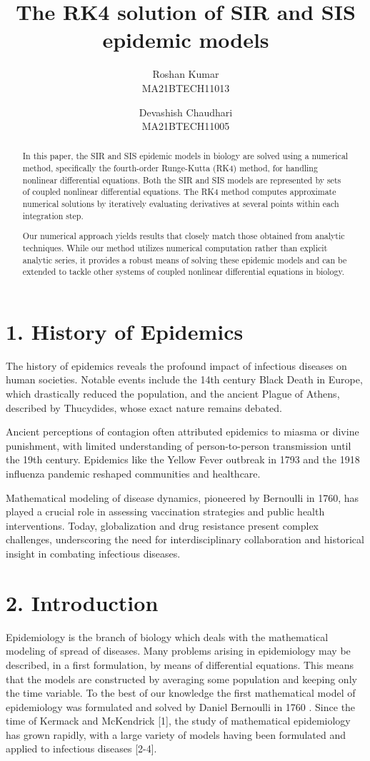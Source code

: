 \documentclass[10pt]{article}
\title{The RK4 solution of SIR and SIS epidemic models}
\author{
    Roshan Kumar \\
    MA21BTECH11013
    \and
    Devashish Chaudhari \\
    MA21BTECH11005
}
\date{}
\begin{document}
\maketitle
        




\begin{abstract}
In this paper, the SIR and SIS epidemic models in biology are solved using a numerical method, specifically the fourth-order Runge-Kutta (RK4) method, for handling nonlinear differential equations. Both the SIR and SIS models are represented by sets of coupled nonlinear differential equations. The RK4 method computes approximate numerical solutions by iteratively evaluating derivatives at several points within each integration step.

Our numerical approach yields results that closely match those obtained from analytic techniques. While our method utilizes numerical computation rather than explicit analytic series, it provides a robust means of solving these epidemic models and can be extended to tackle other systems of coupled nonlinear differential equations in biology.
\end{abstract}


\section*{1. History of Epidemics}
The history of epidemics reveals the profound impact of infectious diseases on human societies. Notable events include the 14th century Black Death in Europe, which drastically reduced the population, and the ancient Plague of Athens, described by Thucydides, whose exact nature remains debated.

Ancient perceptions of contagion often attributed epidemics to miasma or divine punishment, with limited understanding of person-to-person transmission until the 19th century. Epidemics like the Yellow Fever outbreak in 1793 and the 1918 influenza pandemic reshaped communities and healthcare.

Mathematical modeling of disease dynamics, pioneered by Bernoulli in 1760, has played a crucial role in assessing vaccination strategies and public health interventions. Today, globalization and drug resistance present complex challenges, underscoring the need for interdisciplinary collaboration and historical insight in combating infectious diseases.
\section*{2. Introduction}
Epidemiology is the branch of biology which deals with the mathematical modeling of spread of diseases. Many problems arising in epidemiology may be described, in a first formulation, by means of differential equations. This means that the models are constructed by averaging some population and keeping only the time variable. To the best of our knowledge the first mathematical model of epidemiology was formulated and solved by Daniel Bernoulli in 1760 . Since the time of Kermack and McKendrick [1], the study of mathematical epidemiology has grown rapidly, with a large variety of models having been formulated and applied to infectious diseases [2-4].
\end{document}
